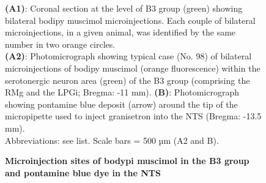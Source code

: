 \documentclass[a4paper,12pt,twoside]{report}
\begin{document}
\begin{figure}[p]
\caption[Microinjection sites localisation in the B3 group and the NTS]{\textbf{Microinjection sites of bodypi muscimol in the B3 group and pontamine blue dye in the NTS}}

{\protect\parbox[t]{18cm}{
\begin{small}
\textbf{(A1)}: Coronal section at the level of B3 group (green) showing bilateral bodipy muscimol microinjections. Each couple of bilateral microinjections, in a given animal, was identified by the same number in two orange circles.\\
\textbf{(A2)}: Photomicrograph showing typical case (No. 98) of bilateral microinjections of bodipy muscimol (orange fluorescence) within the serotonergic neuron area (green) of the B3 group (comprising the RMg and the LPGi; Bregma: -11 mm). 
\textbf{(B)}: Photomicrograph showing pontamine blue deposit (arrow) around the tip of the micropipette used to inject granisetron into the NTS (Bregma: -13.5 mm).\\
Abbreviations: see list. Scale bars = 500 µm (A2 and B).
\end{small}}}

\label{Article2-FIG5}

\end{figure}
\end{document}
